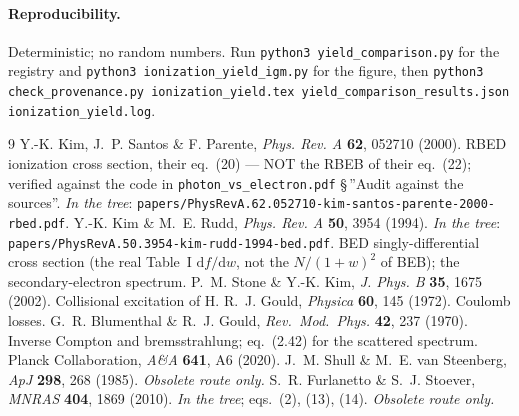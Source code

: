 \documentclass[11pt,a4paper]{article}
\begin{document}
\paragraph{Reproducibility.} Deterministic; no random numbers. Run
\texttt{python3 yield\_comparison.py} for the registry and
\texttt{python3 ionization\_yield\_igm.py} for the figure, then
\texttt{python3 check\_provenance.py ionization\_yield.tex
yield\_comparison\_results.json ionization\_yield.log}.

\begin{thebibliography}{9}\small
{} Y.-K. Kim, J.~P. Santos \& F. Parente, \emph{Phys. Rev. A} \textbf{62},
  052710 (2000). RBED ionization cross section, their eq.~(20) --- NOT the RBEB
  of their eq.~(22); verified against the code in \texttt{photon\_vs\_electron.pdf}
  \S\,''Audit against the sources''. \emph{In the tree}:
  \texttt{papers/PhysRevA.62.052710-kim-santos-parente-2000-rbed.pdf}.
 Y.-K. Kim \& M.~E. Rudd, \emph{Phys. Rev. A} \textbf{50}, 3954 (1994).
  \emph{In the tree}: \texttt{papers/PhysRevA.50.3954-kim-rudd-1994-bed.pdf}.
  BED singly-differential cross section (the real Table~I $\mathrm{d}f/\mathrm{d}w$,
  not the $N/(1+w)^2$ of BEB); the secondary-electron spectrum.
 P.~M. Stone \& Y.-K. Kim, \emph{J. Phys. B} \textbf{35}, 1675 (2002).
  Collisional excitation of H.
 R.~J. Gould, \emph{Physica} \textbf{60}, 145 (1972). Coulomb losses.
 G.~R. Blumenthal \& R.~J. Gould, \emph{Rev.\ Mod.\ Phys.} \textbf{42}, 237
  (1970). Inverse Compton and bremsstrahlung; eq.~(2.42) for the scattered spectrum.
 Planck Collaboration, \emph{A\&A} \textbf{641}, A6 (2020).
 J.~M. Shull \& M.~E. van Steenberg, \emph{ApJ} \textbf{298}, 268 (1985).
  \emph{Obsolete route only.}
 S.~R. Furlanetto \& S.~J. Stoever, \emph{MNRAS} \textbf{404}, 1869 (2010).
  \emph{In the tree}; eqs.~(2), (13), (14). \emph{Obsolete route only.}
\end{thebibliography}
\end{document}
